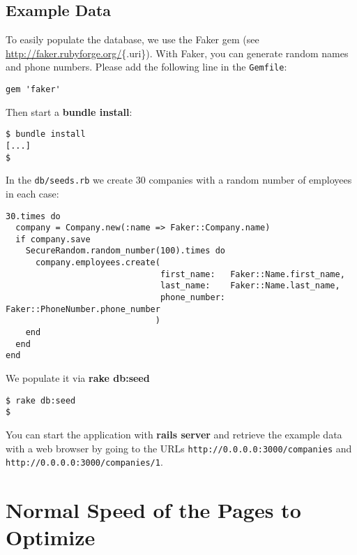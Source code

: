 \documentclass[a4paper]{book}
\newcounter{tab}[chapter]
\newcommand{\chap}[1]{\newpage\thispagestyle{empty}\chapter{#1}\label{chap:\thechapter}}
\begin{document}
\section{Example Data}\label{example-data}

To easily populate the database, we use the Faker gem (see \url{http://faker.rubyforge.org/}\{.uri\}). With Faker, you can generate random names and phone numbers. Please add the following line in the \texttt{Gemfile}:

\begin{shaded}\begin{verbatim}
gem 'faker'
\end{verbatim}\end{shaded}

Then start a \textbf{bundle install}:

\begin{shaded}\begin{verbatim}
$ bundle install
[...]
$
\end{verbatim}\end{shaded}

In the \texttt{db/seeds.rb} we create 30 companies with a random number of employees in each case:

\begin{shaded}\begin{verbatim}
30.times do
  company = Company.new(:name => Faker::Company.name)
  if company.save
    SecureRandom.random_number(100).times do
      company.employees.create(
                               first_name:   Faker::Name.first_name,
                               last_name:    Faker::Name.last_name,
                               phone_number: Faker::PhoneNumber.phone_number
                              )
    end
  end
end
\end{verbatim}\end{shaded}

We populate it via \textbf{rake db:seed}

\begin{shaded}\begin{verbatim}
$ rake db:seed
$
\end{verbatim}\end{shaded}

You can start the application with \textbf{rails server} and retrieve the example data with a web browser by going to the URLs \texttt{http://0.0.0.0:3000/companies} and \texttt{http://0.0.0.0:3000/companies/1}.

\chap{Normal Speed of the Pages to Optimize}\label{normal-speed-of-the-pages-to-optimize}
\end{document}
